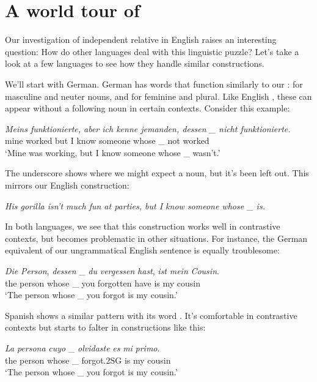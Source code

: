 \section{A world tour of }

Our investigation of independent relative  in English raises an interesting question: How do other languages deal with this linguistic puzzle? Let's take a look at a few languages to see how they handle similar constructions.

We'll start with German. German has words that function similarly to our :  for masculine and neuter nouns, and  for feminine and plural. Like English , these can appear without a following noun in certain contexts. Consider this example:

\ea \textit{Meins funktionierte, aber ich kenne jemanden, dessen \_ nicht funktionierte.}\\
    mine worked but I know someone whose \_ not worked\\
    `Mine was working, but I know someone whose \_ wasn't.'
\z

The underscore shows where we might expect a noun, but it's been left out. This mirrors our English construction:

\ea \textit{His gorilla isn't much fun at parties, but I know someone whose \_ is.}
\z

In both languages, we see that this construction works well in contrastive contexts, but becomes problematic in other situations. For instance, the German equivalent of our ungrammatical English sentence is equally troublesome:

\ea
\gll* \textit{Die} \textit{Person}, \textit{dessen} \_ \textit{du} \textit{vergessen} \textit{hast}, \textit{ist} \textit{mein} \textit{Cousin}.\\
 {} the person whose \_ you forgotten have is my cousin\\
\glt *`The person whose \_ you forgot is my cousin.'
\z

Spanish shows a similar pattern with its word . It's comfortable in contrastive contexts but starts to falter in constructions like this:

\ea
\gll* \textit{La} \textit{persona} \textit{cuyo} \_ \textit{olvidaste} \textit{es} \textit{mi} \textit{primo}.\\
   {} the person whose \_ forgot.2SG is my cousin\\
\glt *`The person whose \_ you forgot is my cousin.'
\z

